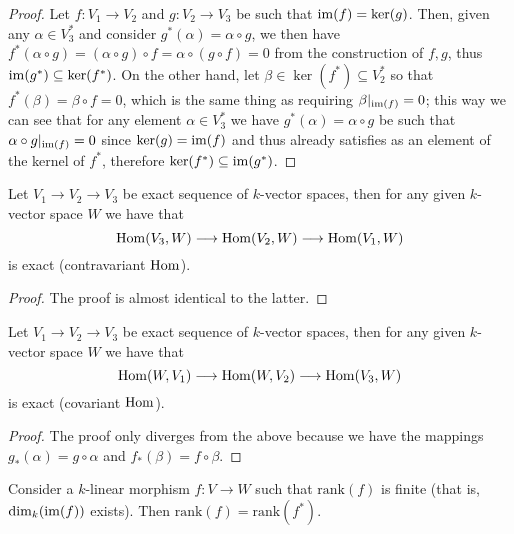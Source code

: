 \begin{proof}
  Let \(f: V_1 \to V_2\) and \(g: V_2 \to V_3\) be such that \(\operatorname{im}(f) =
  \ker(g)\). Then, given any \(\alpha \in V_3^\ast\) and consider
  \(g^\ast(\alpha) = \alpha \circ g\), we then have \(f^\ast(\alpha \circ g) =
  (\alpha \circ g) \circ f = \alpha \circ (g \circ f) = 0\) from the
  construction of \(f, g\), thus \(\operatorname{im}(g^\ast) \subseteq \ker(f^\ast)\). On the
  other hand, let \(\beta \in \ker(f^\ast) \subseteq V_2^\ast\) so that
  \(f^\ast(\beta) = \beta \circ f = 0\), which is the same thing as requiring
  \(\beta|_{\operatorname{im}(f)} = 0\); this way we can see that for any element \(\alpha \in
  V_3^\ast\) we have \(g^\ast(\alpha) = \alpha \circ g\) be such that \(\alpha
  \circ g|_{\operatorname{im}(f)} = 0\) since \(\ker(g) = \operatorname{im}(f)\) and thus already satisfies
  as an element of the kernel of \(f^\ast\), therefore \(\ker(f^\ast) \subseteq
  \operatorname{im}(g^\ast)\).
\end{proof}

\begin{proposition}
  Let \(V_1 \to V_2 \to V_3\) be exact sequence of \(k\)-vector spaces, then for
  any given \(k\)-vector space \(W\) we have that 
  \[
    \operatorname{Hom}(V_3, W) \longrightarrow \operatorname{Hom}(V_2, W) \longrightarrow \operatorname{Hom}(V_1, W)
  \] 
  is exact (contravariant \(\operatorname{Hom}\)).
\end{proposition}

\begin{proof}
  The proof is almost identical to the latter.
\end{proof}

\begin{proposition}
  Let \(V_1 \to V_2 \to V_3\) be exact sequence of \(k\)-vector spaces, then for
  any given \(k\)-vector space \(W\) we have that 
  \[
    \operatorname{Hom}(W, V_1) \longrightarrow \operatorname{Hom}(W, V_2) \longrightarrow \operatorname{Hom}(V_3, W)
  \] 
  is exact (covariant \(\operatorname{Hom}\)).
\end{proposition}

\begin{proof}
  The proof only diverges from the above because we have the mappings
  \(g_\ast(\alpha) = g \circ \alpha\) and \(f_\ast(\beta) = f \circ \beta\).
\end{proof}

\begin{proposition}
  Consider a \(k\)-linear morphism \(f : V \to W\) such that \(\mathrm{rank}(f)\) is
  finite (that is, \(\dim_k(\operatorname{im}(f))\) exists). Then \(\mathrm{rank}(f) =
  \mathrm{rank}(f^\ast)\).
\end{proposition}

